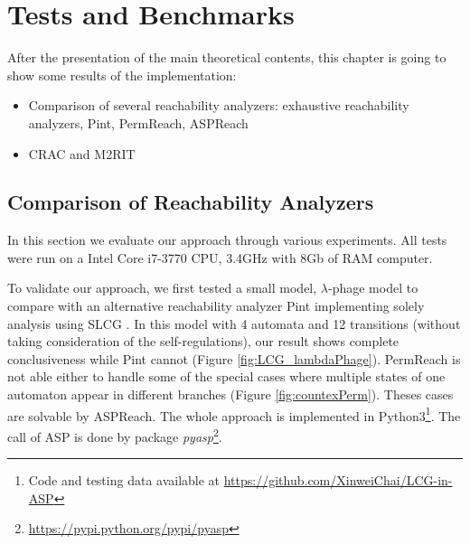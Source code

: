 \chapter{Tests and Benchmarks}\label{chap:test}
After the presentation of the main theoretical contents, this chapter is going to show some results of the implementation:

\begin{itemize}
    \item Comparison of several reachability analyzers: exhaustive reachability analyzers, Pint, PermReach, ASPReach
    \item CRAC and M2RIT
\end{itemize}



\section{Comparison of Reachability Analyzers}
In this section we evaluate our approach through various experiments.
All tests were run on a Intel Core i7-3770 CPU, \@3.4GHz with 8Gb of RAM computer.

To validate our approach, we first tested a small model, $\lambda$-phage model \cite{thieffry1995dynamical} to compare with an alternative reachability analyzer Pint \cite{pauleve2012} implementing solely analysis using SLCG \cite{pauleve2017reduction,folschette2015,pauleve2011}.
In this model with 4 automata and 12 transitions (without taking consideration of the self-regulations),
our result shows complete conclusiveness while Pint cannot (Figure \ref{fig:LCG_lambdaPhage}). %
PermReach \cite{chai2018heuristic} is not able either to handle some of the special cases where multiple states of one automaton appear in different branches (Figure \ref{fig:countexPerm}).
Theses cases are solvable by ASPReach.
The whole approach is implemented in Python3\footnote{Code and testing data available at \url{https://github.com/XinweiChai/LCG-in-ASP}}.
The call of ASP is done by package \textit{pyasp}\footnote{\url{https://pypi.python.org/pypi/pyasp}}. 

